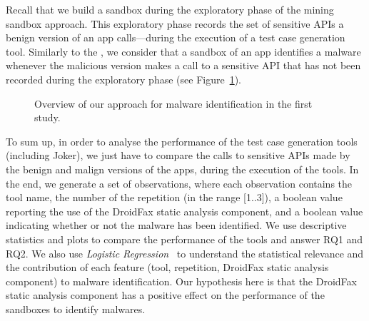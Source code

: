 Recall that we build a sandbox 
during the exploratory phase of the mining
sandbox approach. This exploratory
phase records the set of 
sensitive APIs a benign version of an
app calls---during the execution of a test
case generation tool. Similarly to the \blls,
we consider that a sandbox of an
app identifies a malware whenever the
malicious version makes a call to a sensitive API  
that has not been recorded during the exploratory
phase (see Figure~\ref{fig:settings1}).

\begin{figure}
  \caption{Overview of our approach for malware identification in the first study.}
  \label{fig:settings1}
\end{figure}

To sum up, in order to analyse the
performance of the test case generation tools (including Joker),
we just have to compare the calls to sensitive APIs made by
the benign and malign versions of the apps, during
the execution of the tools. In the end, we generate
a set of observations, where each observation
contains the tool name, the number of the repetition (in the
range [1..3]), a boolean value reporting the use of the
DroidFax static analysis component, and a boolean value indicating
whether or not the malware has been identified. We use descriptive statistics
and plots to compare the performance of the tools and
answer RQ1 and RQ2. We also use \emph{Logistic Regression}~\cite[Chapter~4]{statistical-learning}
to understand the statistical relevance and
the contribution of each feature (tool, repetition, DroidFax static analysis
component) to malware identification. Our hypothesis here is that
the DroidFax static analysis component has a positive
effect on the performance of the sandboxes to identify malwares. 

